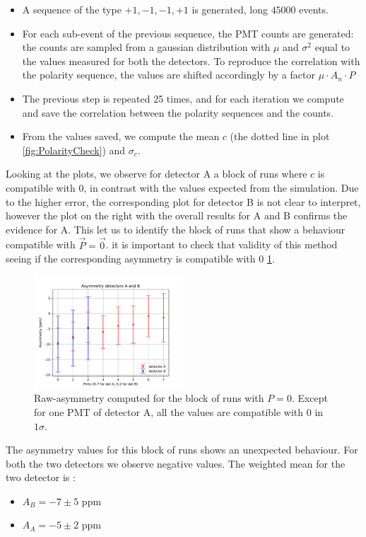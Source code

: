 \begin{itemize}
\item A sequence of the type $+1,-1,-1,+1$ is generated, long $45000$ events.
\item For each sub-event of the previous sequence, the PMT counts are generated: the counts are sampled from a gaussian distribution with $\mu$ and $\sigma^{2}$ equal to the values measured for both the detectors. To reproduce the correlation with the polarity sequence, the values are shifted accordingly  by a factor $\mu \cdot A_{n} \cdot P$  
\item The previous step is repeated 25 times, and for each iteration we compute and save the correlation between the polarity sequences and the counts.
\item From the values saved, we compute the mean $c$ (the dotted line in plot \ref{fig:PolarityCheck}) and $\sigma_{c}$.
\end{itemize}

Looking at the plots, we observe for detector A a block of runs where $c$ is compatible with 0, in contrast with the values expected from the simulation. Due to the higher error, the corresponding plot for detector B is not clear to interpret, however the plot on the right with the overall results for A and B confirms the evidence for A.
This let us to identify the block of runs that show a behaviour compatible with $\vec{P} = \vec{0}$. it is important to check that validity of this method seeing if the corresponding asymmetry is compatible with $0$ \ref{fig:ZeroAsym}.

\begin{figure}[hbtp]
\centering
\includegraphics[width= 0.5\textwidth]{Analysis/Dataselection/Nopolarity.pdf}
\caption{Raw-asymmetry computed for the block of runs with $P = 0$. Except for one PMT of detector A, all the values are compatible with $0$ in $1\sigma$.}
\label{fig:ZeroAsym}
\end{figure}

The asymmetry values for this block of runs shows an unexpected behaviour. For both the two detectors we observe negative values. The weighted mean for the two detector is :
\begin{itemize}
\item $A_{B} = -7 \pm 5$ ppm
\item $A_{A} = -5 \pm 2$ ppm
\end{itemize}

